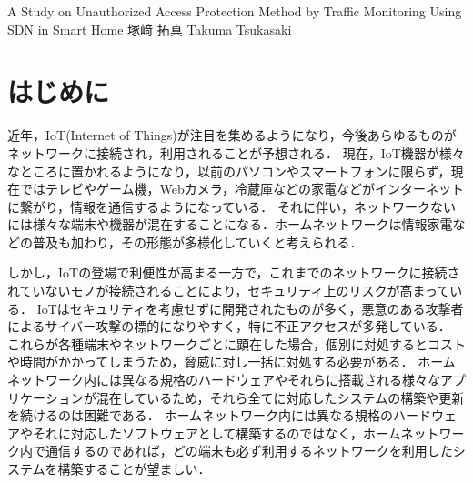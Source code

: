 \documentclass[a4paper,10pt,twocolumn,uplatex]{jsarticle}
\date{10}
\begin{document}
{A Study on Unauthorized Access Protection Method by Traffic Monitoring Using SDN in Smart Home}
{塚﨑 拓真}
{Takuma Tsukasaki}

\section{はじめに}
近年，IoT(Internet of Things)が注目を集めるようになり，今後あらゆるものがネットワークに接続され，利用されることが予想される．
現在，IoT機器が様々なところに置かれるようになり，以前のパソコンやスマートフォンに限らず，現在ではテレビやゲーム機，Webカメラ，冷蔵庫などの家電などがインターネットに繋がり，情報を通信するようになっている．
それに伴い，ネットワークないには様々な端末や機器が混在することになる．ホームネットワークは情報家電などの普及も加わり，その形態が多様化していくと考えられる．\par
しかし，IoTの登場で利便性が高まる一方で，これまでのネットワークに接続されていないモノが接続されることにより，セキュリティ上のリスクが高まっている\cite{guideline}．
IoTはセキュリティを考慮せずに開発されたものが多く，悪意のある攻撃者によるサイバー攻撃の標的になりやすく，特に不正アクセスが多発している．
これらが各種端末やネットワークごとに顕在した場合，個別に対処するとコストや時間がかかってしまうため，脅威に対し一括に対処する必要がある．
ホームネットワーク内には異なる規格のハードウェアやそれらに搭載される様々なアプリケーションが混在しているため，それら全てに対応したシステムの構築や更新を続けるのは困難である．
ホームネットワーク内には異なる規格のハードウェアやそれに対応したソフトウェアとして構築するのではなく，ホームネットワーク内で通信するのであれば，どの端末も必ず利用するネットワークを利用したシステムを構築することが望ましい．

\end{document}
